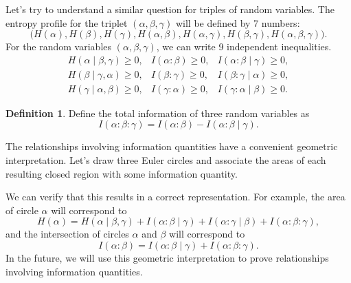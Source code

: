 \documentclass[12pt,sans]{article}
\theoremstyle{definition}
\newtheorem{definition}{Definition}[section]
\theoremstyle{plain}
\theoremstyle{remark}
\begin{document}
Let’s try to understand a similar question for triples of random variables. The entropy profile for the triplet \((\alpha, \beta, \gamma)\) will be defined by 7 numbers:
\[
\bigl(H(\alpha), H(\beta), H(\gamma), H(\alpha, \beta), H(\alpha, \gamma),
H(\beta, \gamma), H(\alpha, \beta, \gamma)\bigr).
\]
For the random variables \((\alpha, \beta, \gamma)\), we can write 9 independent inequalities.
\begin{equation*}
\begin{array}{lll}
H(\alpha \mid \beta, \gamma) \ge 0, & I(\alpha : \beta) \ge 0, & I(\alpha : \beta \mid \gamma) \ge 0,\\
H(\beta \mid \gamma, \alpha) \ge 0, & I(\beta : \gamma) \ge 0, & I(\beta : \gamma \mid \alpha) \ge 0,\\
H(\gamma \mid \alpha, \beta) \ge 0, & I(\gamma : \alpha) \ge 0, & I(\gamma : \alpha \mid \beta) \ge 0.
\end{array}
\end{equation*}
\begin{definition}
Define the total information of three random variables as
\[
    I(\alpha : \beta : \gamma) = I(\alpha : \beta) - I(\alpha : \beta \mid \gamma).
\]
\end{definition}

The relationships involving information quantities have a convenient geometric interpretation. Let’s draw three Euler circles and associate the areas of each resulting closed region with some information quantity.
    \begin{center}
    \end{center}
We can verify that this results in a correct representation. For example, the area of circle \(\alpha\) will correspond to
\[
H(\alpha) = H(\alpha \mid \beta, \gamma) + I(\alpha : \beta \mid \gamma)
+ I(\alpha : \gamma \mid \beta) + I(\alpha : \beta : \gamma),
\]
and the intersection of circles \(\alpha\) and \(\beta\) will correspond to
\[
I(\alpha : \beta) = I(\alpha : \beta \mid \gamma) + I(\alpha : \beta : \gamma).
\]
In the future, we will use this geometric interpretation to prove relationships involving information quantities.
\end{document}
